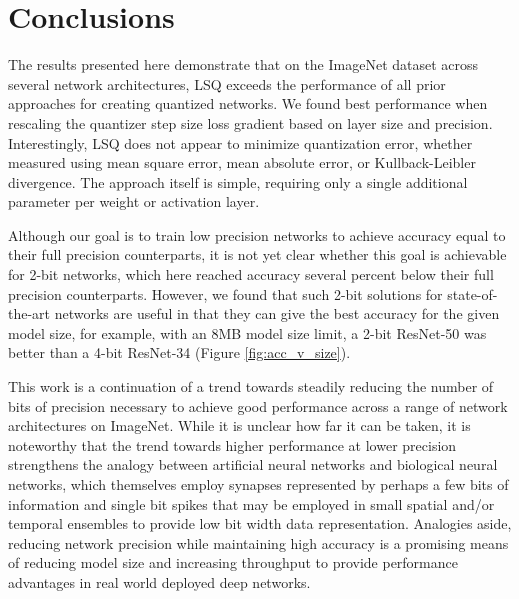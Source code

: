 \documentclass{article}
\begin{document}
\section{Conclusions}

The results presented here demonstrate that on the ImageNet dataset across several network architectures, LSQ exceeds the performance of all prior approaches for creating quantized networks.
We found best performance when rescaling the quantizer step size loss gradient based on layer size and precision.
Interestingly, LSQ does not appear to minimize quantization error, whether measured using mean square error, mean absolute error, or Kullback-Leibler divergence.
The approach itself is simple, requiring only a single additional parameter per weight or activation layer.


Although our goal is to train low precision networks to achieve accuracy equal to their full precision counterparts, it is not yet clear whether this goal is achievable for 2-bit networks, which here reached accuracy several percent below their full precision counterparts.  However, we found that such 2-bit solutions for state-of-the-art networks are useful in that they can give the best accuracy for the given model size, for example, with an 8MB model size limit, a 2-bit ResNet-50 was better than a 4-bit ResNet-34 (Figure \ref{fig:acc_v_size}).

This work is a continuation of a trend towards steadily reducing the number of bits of precision necessary to achieve good performance across a range of network architectures on ImageNet.
While it is unclear how far it can be taken, it is noteworthy that the trend towards higher performance at lower precision strengthens the analogy between artificial neural networks and biological neural networks, which themselves employ synapses represented by perhaps a few bits of information \citep{bartol2015nanoconnectomic} and single bit spikes that may be employed in small spatial and/or temporal ensembles to provide low bit width data representation.
Analogies aside, reducing network precision while maintaining high accuracy is a promising means of reducing model size and increasing throughput to provide performance advantages in real world deployed deep networks.




\FloatBarrier






\FloatBarrier
\end{document}
